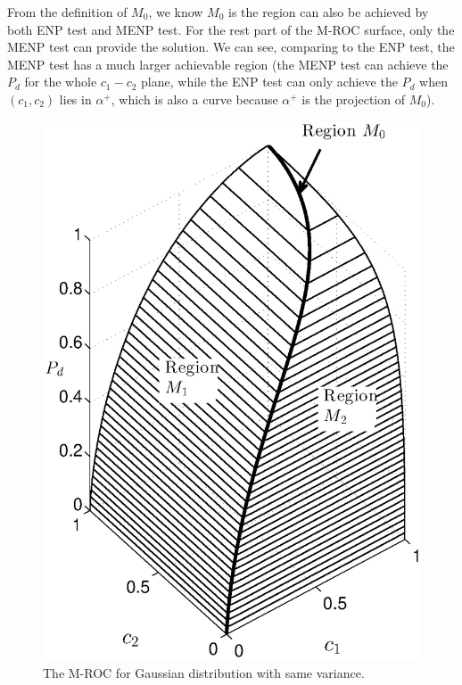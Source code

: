 From the definition of $M_0$, we know $M_0$ is the region can also be achieved by both ENP test and MENP test. For the rest part of the M-ROC surface, only the MENP test can provide the solution. We can see, comparing to the ENP test, the MENP test has a much larger achievable region (the MENP test can achieve the $P_d$ for the whole $c_1-c_2$ plane, while the ENP test can only achieve the $P_d$ when $(c_1, c_2)$ lies in $\alpha^+$, which is also a curve because $\alpha^+$ is the projection of $M_0$). 

\begin{figure}[!t]
\centering
\includegraphics[width=12cm, height=16cm]{3/gaussian.eps}
\caption{The M-ROC for Gaussian distribution with same variance.}
\label{pic: surface for same variance}
\end{figure}
